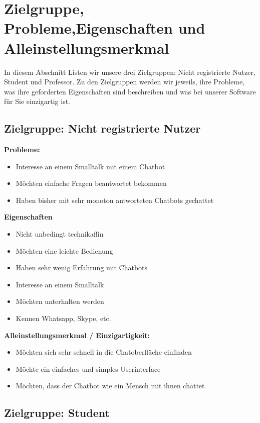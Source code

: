 \section{Zielgruppe, Probleme,Eigenschaften und Alleinstellungsmerkmal}
In diesem Abschnitt Listen wir unsere drei Zielgruppen: Nicht registrierte Nutzer, Student und Professor.
Zu den Zielgruppen werden wir jeweils, ihre Probleme, was ihre geforderten Eigenschaften sind beschreiben und was bei unserer Software für Sie 
einzigartig ist.


\subsection{Zielgruppe: Nicht registrierte Nutzer}

\textbf{Probleme:}
\begin{itemize}
    \item Interesse an einem Smalltalk mit einem Chatbot
    \item Möchten einfache Fragen beantwortet bekommen
    \item Haben bisher mit sehr monoton antworteten Chatbots gechattet
\end{itemize}
\medskip

\textbf{Eigenschaften}
\begin{itemize}
    \item Nicht unbedingt technikaffin
    \item Möchten eine leichte Bedienung
    \item Haben sehr wenig Erfahrung mit Chatbots
    \item Interesse an einem Smalltalk
    \item Möchten unterhalten werden
    \item Kennen Whatsapp, Skype, etc.
\end{itemize}
\medskip

\textbf{Alleinstellungsmerkmal / Einzigartigkeit:}
\begin{itemize}
    \item Möchten sich sehr schnell in die Chatoberfläche einfinden
    \item Möchte ein einfaches und simples Userinterface
    \item Möchten, dass der Chatbot wie ein Mensch mit ihnen chattet
\end{itemize}

\subsection{Zielgruppe: Student}

